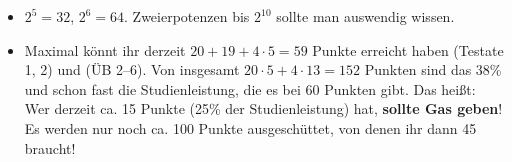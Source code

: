 \documentclass[11pt, a4paper]{article}
\begin{document}
\begin{itemize}
\item $2^5 = 32$, $2^6 = 64$. Zweierpotenzen bis $2^{10}$ sollte man auswendig wissen. 

\vfill

\item Maximal könnt ihr derzeit $20 + 19 + 4\cdot 5 = 59$ Punkte erreicht haben (Testate 1, 2) und (ÜB 2--6). Von insgesamt $20 \cdot 5 + 4 \cdot 13 = 152$ Punkten sind das 38\% und schon fast die Studienleistung, die es bei 60 Punkten gibt. Das heißt: Wer derzeit ca. 15 Punkte (25\% der Studienleistung) hat, \textbf{sollte Gas geben}! Es werden nur noch ca. 100 Punkte ausgeschüttet, von denen ihr dann 45 braucht! 

\end{itemize}









\newpage
\end{document}
